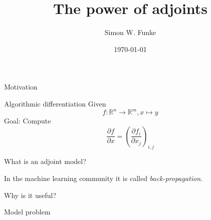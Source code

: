 \documentclass[mathserif]{beamer}
\title[Scientific Computing Seminar]{The power of adjoints}
\author{Simon W. Funke}
\institute{Simula Research Laboratory}
\date{\today}
\begin{document}
\simulatitlepage


\begin{frame}{Motivation}

\end{frame}


\begin{frame}{Algorithmic differentiation}
Given
\begin{equation}
f: \mathbb R^n \to \mathbb R^m, x \mapsto y
\end{equation}
Goal: Compute
\begin{equation}
\frac{\partial f}{\partial x} = \left(\frac{\partial f_i}{\partial x_j}\right)_{i, j}
\end{equation}
\end{frame}

\begin{frame}{What is an adjoint model?}
  

In the machine learning community it is called \emph{back-propagation}.

\end{frame}



\begin{frame}{Why is it useful?}
  

\end{frame}

\begin{frame}{Model problem}
  

\end{frame}




\end{document}
